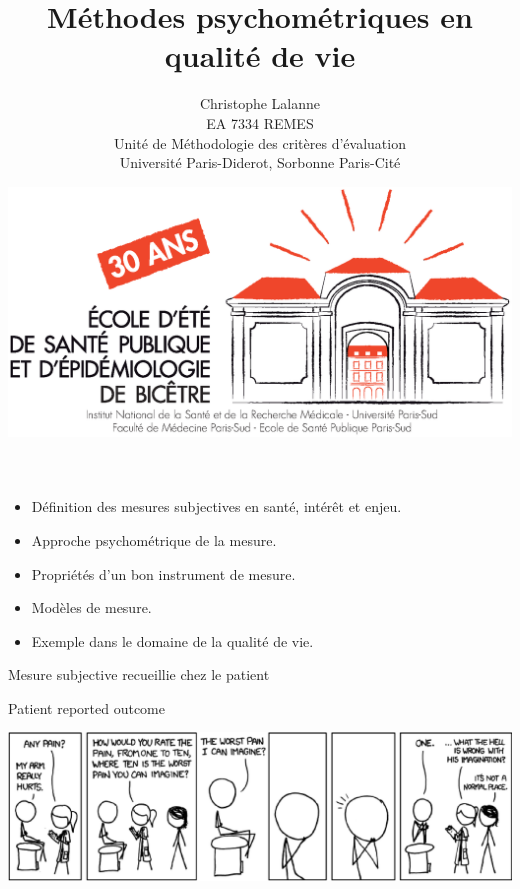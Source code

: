 

\title{Méthodes psychométriques en qualité de vie}
\author{Christophe Lalanne\\EA 7334 REMES\\ Unité de Méthodologie des critères d’évaluation\\Université Paris-Diderot, Sorbonne Paris-Cité\\}
\date{\includegraphics[height=18ex]{logo.eps}}




\LogoOff
\maketitle
\rightfooter{\quad\textsf{\thepage}}



\begin{itemize}
\item Définition des mesures subjectives en santé, intérêt et enjeu.
\item Approche psychométrique de la mesure.
\item Propriétés d'un bon instrument de mesure.
\item Modèles de mesure.
\item Exemple dans le domaine de la qualité de vie.
\end{itemize}



Mesure subjective recueillie chez le patient

Patient reported outcome


\foilhead{}

\bigskip
{\centering \includegraphics[width=\textwidth]{figs/pain.eps}\par}

